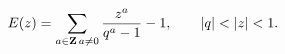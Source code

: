 \begin{equation}
E(z)=\sum_{a\in{\bf Z}\,a\neq 0} \frac{z^a  }
{q^a -1}-1, \qquad |q|<|z|<1.
\label{SerE2}
\end{equation}

